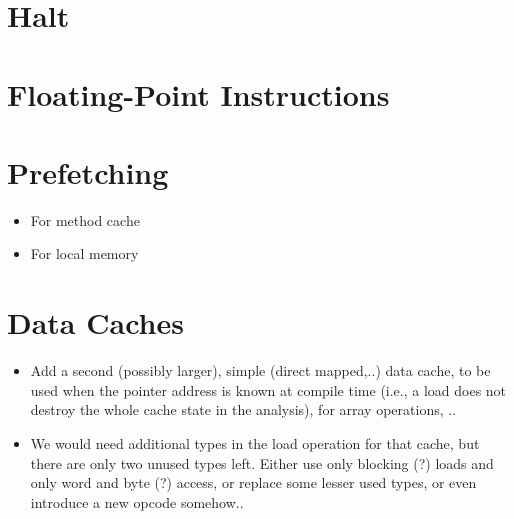 \documentclass[a4paper,fontsize=10pt,twoside,DIV15,BCOR12mm,headinclude=true,footinclude=false,pagesize,bibtotoc]{scrbook}
\newcommand{\comment}[3]{

\textsf{\textbf{#1}} {\color{#3}#2}}
\newcommand{\stefan}[1]{\comment{Stefan}{#1}{RoyalPurple}}
\newcommand{\fb}[1]{\comment{Florian}{#1}{Emerald}}
\renewcommand{\stefan}[1]{}
\renewcommand{\fb}[1]{}
\begin{document}
\section{Halt}
\fb{Might not be needed for now. In the simulator we could simply jump to a
label \texttt{exit} or \texttt{halt} or do an explicit syscall to quit the
simulation.}

\section{Floating-Point Instructions}

\section{Prefetching}

\begin{itemize}
  \item For method cache
  \item For local memory
\end{itemize}

\stefan{Prefetching with Method cache with FIFO is tricky, maybe we can use an I-SPM to store code that is executed while we prefetch the
method cache.}

\section{Data Caches}

\begin{itemize}
  \item Add a second (possibly larger), simple (direct mapped,..) data cache, to be used when the pointer address is known at compile time
    (i.e., a load does not destroy the whole cache state in the analysis), for array operations, ..
  \item We would need additional types in the load operation for that cache, but there are only two unused types left. Either use only
    blocking (?) loads and only word and byte (?) access, or replace some lesser used types, or even introduce a new opcode somehow..
\end{itemize}

\stefan{There were some plans about introducing two separate data caches, one direct mapped and a small fully associative (B1.1.6
in the final DoW), with the intention to avoid having loads from unknown addresses destroy the direct mapped cache state in the analysis.
Therefore we might want to reserve some types for loads that use a second data cache (if we do not use write-allocation for store, we do not need to make
this distinction for the store operation).}
\end{document}
